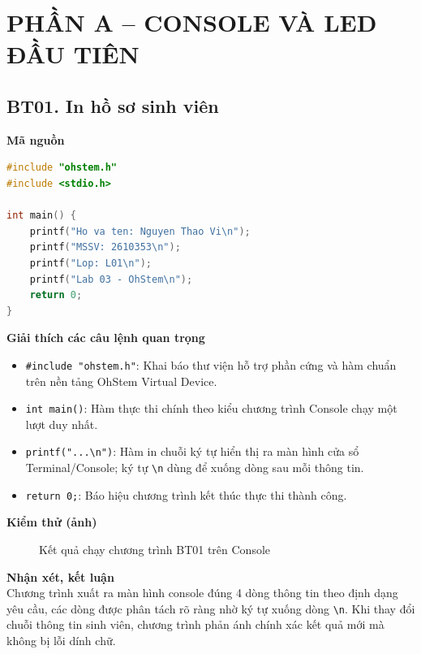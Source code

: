 \section*{PHẦN A – CONSOLE VÀ LED ĐẦU TIÊN}

\subsection*{BT01. In hồ sơ sinh viên}

\noindent\textbf{Mã nguồn}\\
\begin{lstlisting}[language=C]
#include "ohstem.h"
#include <stdio.h>

int main() {
    printf("Ho va ten: Nguyen Thao Vi\n");
    printf("MSSV: 2610353\n");
    printf("Lop: L01\n");
    printf("Lab 03 - OhStem\n");
    return 0;
}
\end{lstlisting}

\noindent\textbf{Giải thích các câu lệnh quan trọng}\\
\begin{itemize}
    \item \texttt{\#include "ohstem.h"}: Khai báo thư viện hỗ trợ phần cứng và hàm chuẩn trên nền tảng OhStem Virtual Device.
    \item \texttt{int main()}: Hàm thực thi chính theo kiểu chương trình Console chạy một lượt duy nhất.
    \item \texttt{printf("...\textbackslash n")}: Hàm in chuỗi ký tự hiển thị ra màn hình cửa sổ Terminal/Console; ký tự \texttt{\textbackslash n} dùng để xuống dòng sau mỗi thông tin.
    \item \texttt{return 0;}: Báo hiệu chương trình kết thúc thực thi thành công.
\end{itemize}

\noindent\textbf{Kiểm thử (ảnh)}\\
\begin{figure}[H]
    \centering
    \caption{Kết quả chạy chương trình BT01 trên Console}
    \label{fig:bt01}
\end{figure}

\noindent\textbf{Nhận xét, kết luận}\\
Chương trình xuất ra màn hình console đúng 4 dòng thông tin theo định dạng yêu cầu, các dòng được phân tách rõ ràng nhờ ký tự xuống dòng \texttt{\textbackslash n}. Khi thay đổi chuỗi thông tin sinh viên, chương trình phản ánh chính xác kết quả mới mà không bị lỗi dính chữ.


